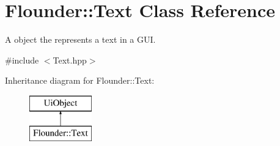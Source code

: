 \hypertarget{class_flounder_1_1_text}{}\section{Flounder\+:\+:Text Class Reference}
\label{class_flounder_1_1_text}


A object the represents a text in a G\+UI.  




{\ttfamily \#include $<$Text.\+hpp$>$}

Inheritance diagram for Flounder\+:\+:Text\+:\begin{figure}[H]
\begin{center}
\leavevmode
\includegraphics[height=2.000000cm]{class_flounder_1_1_text}
\end{center}
\end{figure}
